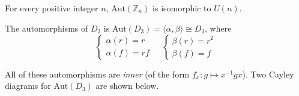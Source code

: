  \begin{theorem}
    For every positive integer $n$, $\text{Aut}(\mathbb{Z}_n)$ is isomorphic to $U(n)$.
 \end{theorem}
 
 \begin{example}
     The automorphisms of $D_3$ is $\text{Aut}(D_3) = \langle \alpha, \beta \rangle \cong D_3$, where 
     \[
         \begin{cases}
             \alpha(r) = r\\
             \alpha(f) = rf 
         \end{cases}
         \quad         
         \begin{cases}
             \beta(r) = r^2\\
             \beta(f) = f 
         \end{cases}
     \]
 
     All of these automorphisms are \textit{inner} (of the form $f_x : g \mapsto x^{-1}gx$). Two Cayley diagrams for $\text{Aut}(D_3)$
     are shown below.
 
     \vspace{-4mm}
   

\end{example}
